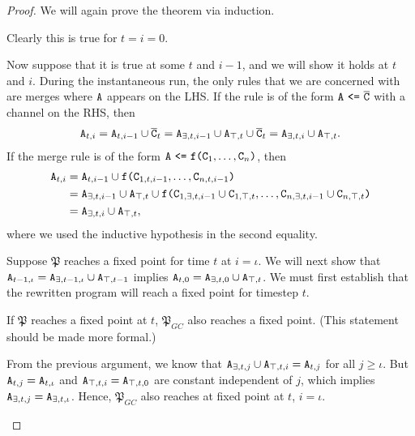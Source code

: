 \begin{proof}
We will again prove the theorem via induction.

Clearly this is true for $t=i=0$.

Now suppose that it is true at some $t$ and $i-1$, and we will show it holds at $t$ and $i$.
During the instantaneous run, the only rules that we are concerned with are merges where $\tt{A}$ appears on the LHS.
If the rule is of the form $\tt{A} ~\tt{<=}~ \overline{\tt{C}}$ with a channel on the RHS, then
\begin{align*}
\tt{A}_{t,i}
= \tt{A}_{t,i-1} \cup \overline{\tt{C}}_{t}
= \tt{A}_{\exists,t,i-1} \cup \tt{A}_{\top,t} \cup \overline{\tt{C}}_{t}
= \tt{A}_{\exists,t,i} \cup \tt{A}_{\top,t}.
\end{align*}
If the merge rule is of the form $\tt{A} ~\tt{<=}~ \tt{f}\tt{(}\tt{C}_1,\dots,\tt{C}_n\tt{)}$, then
\begin{align*}
\tt{A}_{t,i}
&= \tt{A}_{t,i-1} \cup \tt{f}\tt{(}\tt{C}_{1,t,i-1},\dots,\tt{C}_{n,t,i-1}\tt{)}\\
&= \tt{A}_{\exists,t,i-1} \cup \tt{A}_{\top,t} \cup \tt{f}\tt{(}\tt{C}_{1,\exists,t,i-1}\cup\tt{C}_{1,\top,t},\dots,\tt{C}_{n,\exists,t,i-1}\cup\tt{C}_{n,\top,t}\tt{)}\\
&= \tt{A}_{\exists,t,i} \cup \tt{A}_{\top,t},
\end{align*}
where we used the inductive hypothesis in the second equality.

Suppose $\mathfrak{P}$ reaches a fixed point for time $t$ at $i=\iota$.
We will next show that $\tt{A}_{t-1,\iota} = \tt{A}_{\exists,t-1,\iota} \cup \tt{A}_{\top,t-1}$ implies $\tt{A}_{t,0} = \tt{A}_{\exists,t,0} \cup \tt{A}_{\top,t}$.
We must first establish that the rewritten program will reach a fixed point for timestep $t$.

\begin{claim}
If $\mathfrak{P}$ reaches a fixed point at $t$, $\mathfrak{P}_{GC}$ also reaches a fixed point.
(This statement should be made more formal.)
\end{claim}
\begin{claimproof}
From the previous argument, we know that $\tt{A}_{\exists,t,j} \cup \tt{A}_{\top,t,i} = \tt{A}_{t,j}$ for all $j \geq \iota$.
But $\tt{A}_{t,j} = \tt{A}_{t,\iota}$ and $\tt{A}_{\top,t,i} = \tt{A}_{\top,t,0}$ are constant independent of $j$, which implies $\tt{A}_{\exists,t,j} = \tt{A}_{\exists,t,\iota}$.
Hence, $\mathfrak{P}_{GC}$ also reaches at fixed point at $t$, $i=\iota$.
\end{claimproof}


\end{proof}
